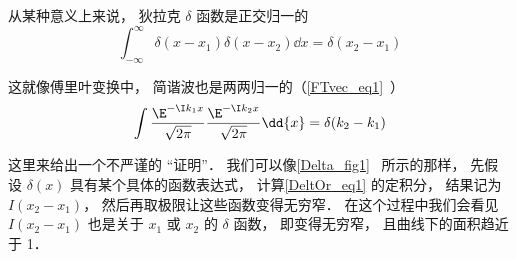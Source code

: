 

从某种意义上来说， 狄拉克 $\delta$ 函数是正交归一的
\begin{equation}\label{DeltOr_eq1}
\int_{-\infty}^{\infty}\delta(x - x_1) \delta(x - x_2) \dd{x} = \delta(x_2 - x_1)
\end{equation}

这就像傅里叶变换中， 简谐波也是两两归一的（\autoref{FTvec_eq1}~）
\begin{equation}
\int \frac{\E^{-\I k_1 x}}{\sqrt{2\pi }} \frac{\E^{-\I k_2 x}}{\sqrt{2\pi }} \dd{x} = \delta (k_2 - k_1)
\end{equation}

这里来给出一个不严谨的 “证明”． 我们可以像\autoref{Delta_fig1}~ 所示的那样， 先假设 $\delta(x)$ 具有某个具体的函数表达式， 计算\autoref{DeltOr_eq1} 的定积分， 结果记为 $I(x_2 - x_1)$， 然后再取极限让这些函数变得无穷窄． 在这个过程中我们会看见 $I(x_2 - x_1)$ 也是关于 $x_1$ 或 $x_2$ 的 $\delta$ 函数， 即变得无穷窄， 且曲线下的面积趋近于 1．
